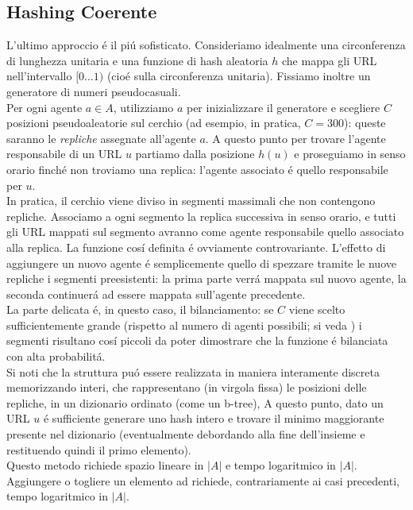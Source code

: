 \subsection{Hashing Coerente}
L'ultimo approccio é il piú sofisticato. Consideriamo idealmente una circonferenza di lunghezza unitaria e una funzione di hash aleatoria $h$ che mappa gli URL nell'intervallo $[0\dots1)$ (cioé sulla circonferenza unitaria). Fissiamo inoltre un generatore di numeri pseudocasuali.\\
Per ogni agente $a \in A$, utilizziamo $a$ per inizializzare il generatore e scegliere $C$ posizioni pseudoaleatorie sul cerchio (ad esempio, in pratica, $C = 300$): queste saranno le \textit{repliche} assegnate all'agente $a$. A questo punto per trovare l'agente responsabile di un URL $u$ partiamo dalla posizione $h(u)$ e proseguiamo in senso orario finché non troviamo una replica: l'agente associato é quello responsabile per $u$.\\
In pratica, il cerchio viene diviso in segmenti massimali che non contengono repliche. Associamo a ogni segmento la replica successiva in senso orario, e tutti gli URL mappati sul segmento avranno come agente responsabile quello associato alla replica. La funzione cosí definita é ovviamente controvariante. L'effetto di aggiungere un nuovo agente é semplicemente quello di spezzare tramite le nuove repliche i segmenti preesistenti: la prima parte verrá mappata sul nuovo agente, la seconda continuerá ad essere mappata sull'agente precedente.\\
La parte delicata é, in questo caso, il bilanciamento: se $C$ viene scelto sufficientemente grande (rispetto al numero di agenti possibili; si veda %
) i segmenti risultano cosí piccoli da poter dimostrare che la funzione é bilanciata con alta probabilitá.\\
Si noti che la struttura puó essere realizzata in maniera interamente discreta memorizzando interi, che rappresentano (in virgola fissa) le posizioni delle repliche, in un dizionario ordinato (come un b-tree), A questo punto, dato un URL $u$ é sufficiente generare uno hash intero e trovare il minimo maggiorante presente nel dizionario (eventualmente debordando alla fine dell'insieme e restituendo quindi il primo elemento).\\
Questo metodo richiede spazio lineare in $|A|$ e tempo logaritmico in $|A|$. Aggiungere o togliere un elemento ad  richiede, contrariamente ai casi precedenti, tempo logaritmico in $|A|$.
